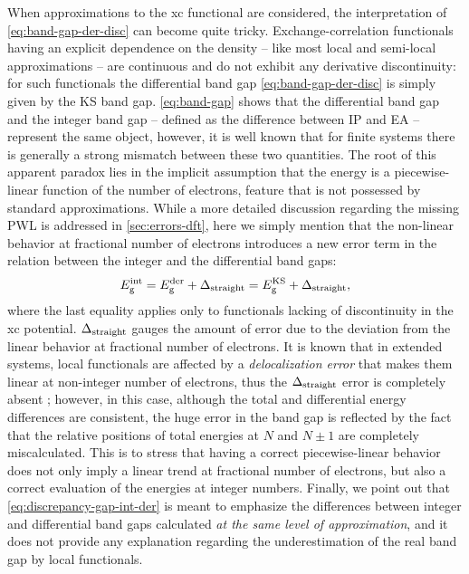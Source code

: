 When approximations to the xc functional are considered, the interpretation of \cref{eq:band-gap-der-disc} can become quite tricky. Exchange-correlation functionals having an explicit dependence on the density -- like most local and semi-local approximations -- are continuous and do not exhibit any derivative discontinuity: for such functionals the differential band gap \eqref{eq:band-gap-der-disc} is simply given by the KS band gap. \cref{eq:band-gap} shows that the differential band gap and the integer band gap -- defined as the difference between IP and EA -- represent the same object, however, it is well known that for finite systems there is generally a strong mismatch between these two quantities. The root of this apparent paradox lies in the implicit assumption that the energy is a piecewise-linear function of the number of electrons, feature that is not possessed by standard approximations. While a more detailed discussion regarding the missing PWL is addressed in \cref{sec:errors-dft}, here we simply mention that the non-linear behavior at fractional number of electrons introduces a new error term in the relation between the integer and the differential band gaps:  
%
\begin{equation}
    E_{\rm g}^{\rm int} = E_{\rm g}^{\rm der} + \Delta_{\rm straight} = E_{\rm g}^{\rm KS} + \Delta_{\rm straight},
    \label{eq:discrepancy-gap-int-der}
\end{equation}
%
where the last equality applies only to functionals lacking of discontinuity in the xc potential. $\Delta_{\rm straight}$ gauges the amount of error due to the deviation from the linear behavior at fractional number of electrons. It is known that in extended systems, local functionals are affected by a \emph{delocalization error} that makes them linear at non-integer number of electrons, thus the $\Delta_{\rm straight}$ error is completely absent  \cite{mori-sanchez_localization_2008}; however, in this case, although the total and differential energy differences are consistent, the huge error in the band gap is reflected by the fact that the relative positions of total energies at $N$ and $N \pm 1$ are completely miscalculated. This is to stress that having a correct piecewise-linear behavior does not only imply a linear trend at fractional number of electrons, but also a correct evaluation of the energies at integer numbers. Finally, we point out that \cref{eq:discrepancy-gap-int-der} is meant to emphasize the differences between integer and differential band gaps calculated \emph{at the same level of approximation}, and it does not provide any explanation regarding the underestimation of the real band gap by local functionals.

